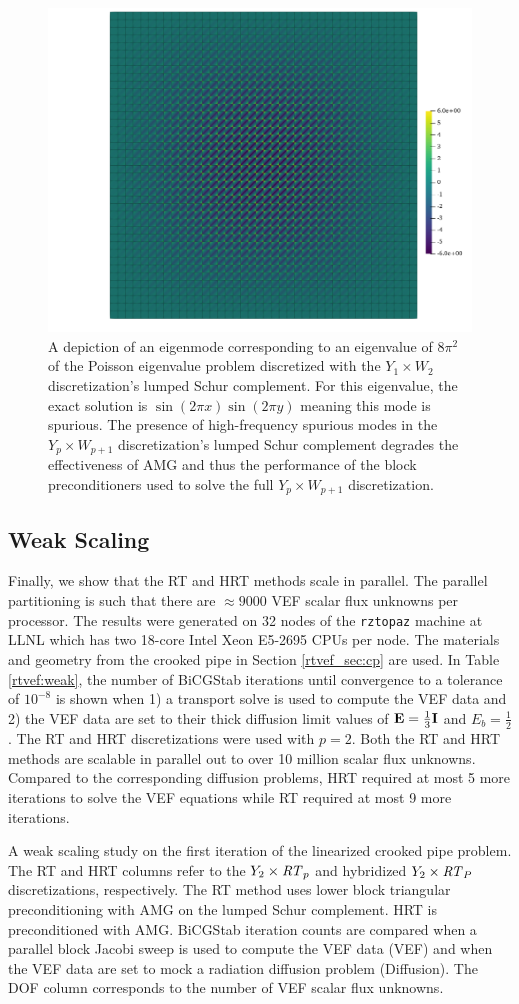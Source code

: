 \documentclass[../doc.tex]{subfiles}
\begin{document}
\begin{figure}
\centering
\includegraphics[width=.5\textwidth]{data/img/badmode40.png}
\caption{A depiction of an eigenmode corresponding to an eigenvalue of $8\pi^2$ of the Poisson eigenvalue problem discretized with the $Y_1\times W_2$ discretization's lumped Schur complement. For this eigenvalue, the exact solution is $\sin(2\pi x)\sin(2\pi y)$ meaning this mode is spurious. The presence of high-frequency spurious modes in the $Y_p\times W_{p+1}$ discretization's lumped Schur complement degrades the effectiveness of AMG and thus the performance of the block preconditioners used to solve the full $Y_p\times W_{p+1}$ discretization.}
\label{rtvef:badmode}
\end{figure}

\subsection{Weak Scaling} \label{rtvef_sec:weak}
Finally, we show that the RT and HRT methods scale in parallel. The parallel partitioning is such that there are $\approx\!\num{9000}$ VEF scalar flux unknowns per processor. The results were generated on 32 nodes of the \texttt{rztopaz} machine at LLNL which has two 18-core Intel Xeon E5-2695 CPUs per node. The materials and geometry from the crooked pipe in Section \ref{rtvef_sec:cp} are used. In Table \ref{rtvef:weak}, the number of BiCGStab iterations until convergence to a tolerance of $10^{-8}$ is shown when 1) a transport solve is used to compute the VEF data and 2) the VEF data are set to their thick diffusion limit values of $\boldsymbol{\mathrm{E}} = \frac{1}{3}\boldsymbol{\mathrm{I}}$ and $E_b = \frac{1}{2}$. The RT and HRT discretizations were used with $p=2$. Both the RT and HRT methods are scalable in parallel out to over 10 million scalar flux unknowns. Compared to the corresponding diffusion problems, HRT required at most 5 more iterations to solve the VEF equations while RT required at most 9 more iterations. 
\begin{table}
\centering
\caption{A weak scaling study on the first iteration of the linearized crooked pipe problem. The RT and HRT columns refer to the $Y_2\times \mathit{RT}_p$ and hybridized $Y_2\times \mathit{RT}_P$ discretizations, respectively. The RT method uses lower block triangular preconditioning with AMG on the lumped Schur complement. HRT is preconditioned with AMG. BiCGStab iteration counts are compared when a parallel block Jacobi sweep is used to compute the VEF data (VEF) and when the VEF data are set to mock a radiation diffusion problem (Diffusion). The DOF column corresponds to the number of VEF scalar flux unknowns.}
\label{rtvef:weak}

\end{table}
\end{document}
